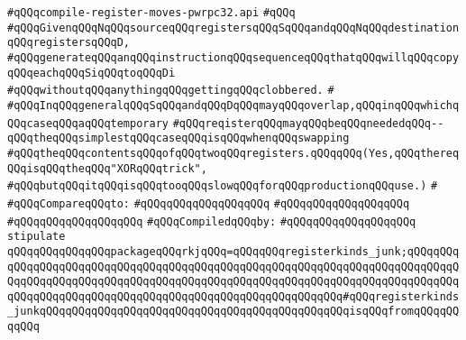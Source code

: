 \label{src/lib/compiler/back/low/pwrpc32/code/compile-register-moves-pwrpc32.api}
\verb|#qQQqcompile-register-moves-pwrpc32.api|\newline
\verb|#qQQq|\newline
\verb|#qQQqGivenqQQqNqQQqsourceqQQqregistersqQQqSqQQqandqQQqNqQQqdestinationqQQqregistersqQQqD,|\newline
\verb|#qQQqgenerateqQQqanqQQqinstructionqQQqsequenceqQQqthatqQQqwillqQQqcopyqQQqeachqQQqSiqQQqtoqQQqDi|\newline
\verb|#qQQqwithoutqQQqanythingqQQqgettingqQQqclobbered.|\newline
\verb|#|\newline
\verb|#qQQqInqQQqgeneralqQQqSqQQqandqQQqDqQQqmayqQQqoverlap,qQQqinqQQqwhichqQQqcaseqQQqaqQQqtemporary|\newline
\verb|#qQQqreqisterqQQqmayqQQqbeqQQqneededqQQq--qQQqtheqQQqsimplestqQQqcaseqQQqisqQQqwhenqQQqswapping|\newline
\verb|#qQQqtheqQQqcontentsqQQqofqQQqtwoqQQqregisters.qQQqqQQq(Yes,qQQqthereqQQqisqQQqtheqQQq"XORqQQqtrick",|\newline
\verb|#qQQqbutqQQqitqQQqisqQQqtooqQQqslowqQQqforqQQqproductionqQQquse.)|\newline
\verb|#|\newline
\verb|#qQQqCompareqQQqto:|\newline
\verb|#qQQqqQQqqQQqqQQqqQQq|\newline
\verb|#qQQqqQQqqQQqqQQqqQQq|\newline
\verb|#qQQqqQQqqQQqqQQqqQQq|\newline
\newline
\verb|#qQQqCompiledqQQqby:|\newline
\verb|#qQQqqQQqqQQqqQQqqQQq|\newline
\newline
\verb|stipulate|\newline
\verb|qQQqqQQqqQQqqQQqpackageqQQqrkjqQQq=qQQqqQQqregisterkinds_junk;qQQqqQQqqQQqqQQqqQQqqQQqqQQqqQQqqQQqqQQqqQQqqQQqqQQqqQQqqQQqqQQqqQQqqQQqqQQqqQQqqQQqqQQqqQQqqQQqqQQqqQQqqQQqqQQqqQQqqQQqqQQqqQQqqQQqqQQqqQQqqQQqqQQqqQQqqQQqqQQqqQQqqQQqqQQqqQQqqQQqqQQqqQQqqQQqqQQqqQQq#qQQqregisterkinds_junkqQQqqQQqqQQqqQQqqQQqqQQqqQQqqQQqqQQqqQQqqQQqqQQqisqQQqfromqQQqqQQqqQQq|\newline
